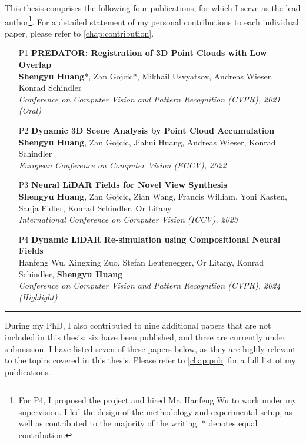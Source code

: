 This thesis comprises the following four publications, for which I serve as the lead author\footnote{For P4, I proposed the project and hired Mr. Hanfeng Wu to work under my supervision. I led the design of the methodology and experimental setup, as well as contributed to the majority of the writing. * denotes equal contribution.}. For a detailed statement of my personal contributions to each individual paper, please refer to \cref{chap:contribution}. 
\begin{itemize}
    \item [P1] \noindent\textbf{ PREDATOR: Registration of 3D Point Clouds with Low Overlap} \\[0.5em]
    \textbf{Shengyu Huang}*, Zan Gojcic*, Mikhail Usvyatsov, Andreas Wieser, Konrad Schindler \\
    \textit{Conference on Computer Vision and Pattern Recognition (CVPR), 2021 (Oral)}
    
    \item [P2] \noindent\textbf{ Dynamic 3D Scene Analysis by Point Cloud Accumulation} \\[0.5em]
    \textbf{Shengyu Huang}, Zan Gojcic, Jiahui Huang, Andreas Wieser, Konrad Schindler \\
    \textit{European Conference on Computer Vision (ECCV), 2022}
    
    \item [P3] \noindent\textbf{ Neural LiDAR Fields for Novel View Synthesis} \\[0.5em]
    \textbf{Shengyu Huang}, Zan Gojcic, Zian Wang, Francis William, Yoni Kasten, Sanja Fidler, Konrad Schindler, Or Litany \\
    \textit{International Conference on Computer Vision (ICCV), 2023}
    
    \item [P4] \noindent\textbf{ Dynamic LiDAR Re-simulation using Compositional Neural Fields} \\[0.5em]
    Hanfeng Wu, Xingxing Zuo, Stefan Leutenegger, Or Litany, Konrad Schindler, \textbf{Shengyu Huang} \\
    \textit{Conference on Computer Vision and Pattern Recognition (CVPR), 2024 (Highlight)}
\end{itemize}

\vspace{1em}
\hrule
\vspace{1em}

\noindent
During my PhD, I also contributed to nine additional papers that are not included in this thesis; six have been published, and three are currently under submission. I have listed seven of these papers below, as they are highly relevant to the topics covered in this thesis. Please refer to \cref{chap:pub} for a full list of my publications.

